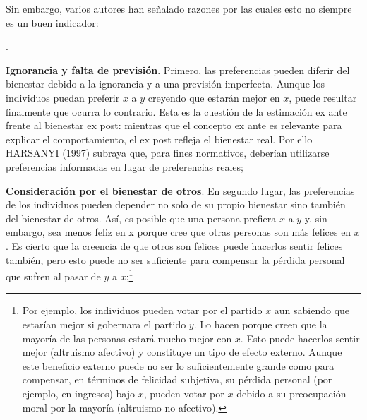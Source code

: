 \documentclass[10pt,a4paper]{article}
\newcounter{numitem}
\newenvironment{lnum}
      {\begin{list}{\arabic{numitem}.}{%
          \usecounter{numitem}%
          \setlength{\leftmargin}{1cm}%
          \setlength{\parskip}{3pt}%
          \setlength{\itemsep}{0pt}%
          \setlength{\parsep}{0pt}%
      }}
      {\end{list}}
\begin{document}
Sin embargo, varios autores han señalado razones por las cuales esto no siempre es un buen indicador:
\begin{lnum}
    \item \textbf{Ignorancia y falta de previsión}. Primero, las preferencias pueden diferir del bienestar debido a la ignorancia y a una previsión imperfecta. Aunque los individuos puedan preferir $x$ a $y$ creyendo que estarán mejor en $x$, puede resultar finalmente que ocurra lo contrario. Esta es la cuestión de la estimación ex ante frente al bienestar ex post: mientras que el concepto ex ante es relevante para explicar el comportamiento, el ex post refleja el bienestar real. Por ello HARSANYI (1997) subraya que, para fines normativos, deberían utilizarse preferencias informadas en lugar de preferencias reales;
    \item \textbf{Consideración por el bienestar de otros}. En segundo lugar, las preferencias de los individuos pueden depender no solo de su propio bienestar sino también del bienestar de otros. Así, es posible que una persona prefiera $x$ a $y$ y, sin embargo, sea menos feliz en x porque cree que otras personas son más felices en $x$. Es cierto que la creencia de que otros son felices puede hacerlos sentir felices también, pero esto puede no ser suficiente para compensar la pérdida personal que sufren al pasar de $y$ a $x$;\footnote{%
        Por ejemplo, los individuos pueden votar por el partido $x$ aun sabiendo que estarían mejor si gobernara el partido $y$. Lo hacen porque creen que la mayoría de las personas estará mucho mejor con $x$. Esto puede hacerlos sentir mejor (altruismo afectivo) y constituye un tipo de efecto externo. Aunque este beneficio externo puede no ser lo suficientemente grande como para compensar, en términos de felicidad subjetiva, su pérdida personal (por ejemplo, en ingresos) bajo $x$, pueden votar por $x$ debido a su preocupación moral por la mayoría (altruismo no afectivo). 
    
}
\end{lnum}
\end{document}
